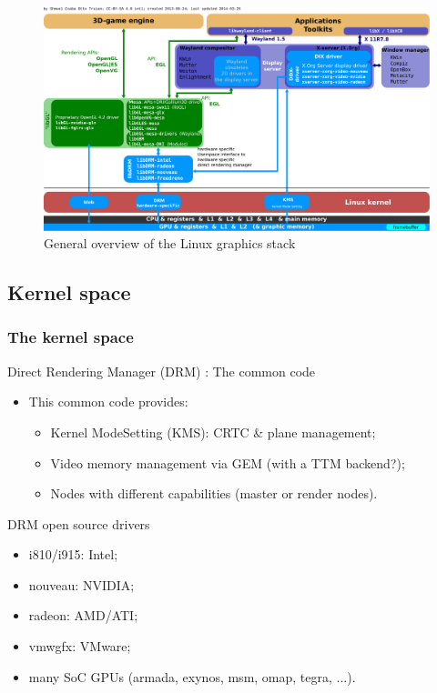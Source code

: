 \documentclass[11pt,english,compress]{beamer}
\begin{document}
\begin{frame}
	\begin{figure}[h]
		\centering
		\includegraphics[width=1.02\linewidth]{imgs/Linux_Graphics_Stack_2013.pdf}
		\caption{General overview of the Linux graphics stack}
	\end{figure}
\end{frame}

\subsection{Kernel space}
\begin{frame}
	\frametitle{The kernel space}

	\begin{block}{Direct Rendering Manager (DRM) : The common code}
		\begin{itemize}
			\item This common code provides:
			\begin{itemize}
				\item Kernel ModeSetting (KMS): CRTC \& plane management;
				\item Video memory management via GEM (with a TTM backend?);
				\item Nodes with different capabilities (master or render nodes).
			\end{itemize}
		\end{itemize}
	\end{block}

	\begin{block}{DRM open source drivers}
		\begin{itemize}
			\item i810/i915: Intel;
			\item nouveau: NVIDIA;
			\item radeon: AMD/ATI;
			\item vmwgfx: VMware;
			\item many SoC GPUs (armada, exynos, msm, omap, tegra, ...).
		\end{itemize}
	\end{block}
\end{frame}
\end{document}
